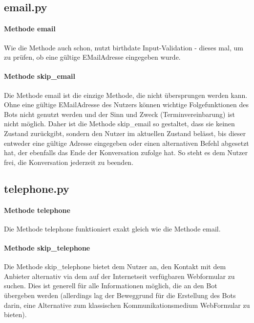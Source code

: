         
        \subsection{email.py}
            \paragraph{Methode email}
                Wie die Methode auch schon, nutzt birthdate Input-Validation - dieses mal, um zu prüfen, ob eine gültige E\-Mail\-Adresse eingegeben wurde. 

            \paragraph{Methode skip\_email}
                Die Methode email ist die einzige Methode, die nicht übersprungen werden kann. Ohne eine gültige E\-Mail\-Adresse des Nutzers können wichtige Folgefunktionen des Bots nicht genutzt werden und der Sinn und Zweck (Terminvereinbarung) ist nicht möglich. Daher ist die Methode skip\_email so gestaltet, dass sie keinen Zustand zurückgibt, sondern den Nutzer im aktuellen Zustand belässt, bis dieser entweder eine gültige Adresse eingegeben oder einen alternativen Befehl abgesetzt hat, der ebenfalls das Ende der Konversation zufolge hat. So steht es dem Nutzer frei, die Konversation jederzeit zu beenden. 
        
            
        \subsection{telephone.py}
            \paragraph{Methode telephone}
                Die Methode telephone funktioniert exakt gleich wie die Methode email.

            \paragraph{Methode skip\_telephone}
                Die Methode skip\_telephone bietet dem Nutzer an, den Kontakt mit dem Anbieter alternativ via dem auf der Internetseit verfügbaren Webformular zu suchen. Dies ist generell für alle Informationen möglich, die an den Bot übergeben werden (allerdings lag der Beweggrund für die Erstellung des Bots darin, eine Alternative zum klassischen Kommunikationsmedium Web\-Formular zu bieten).
        
